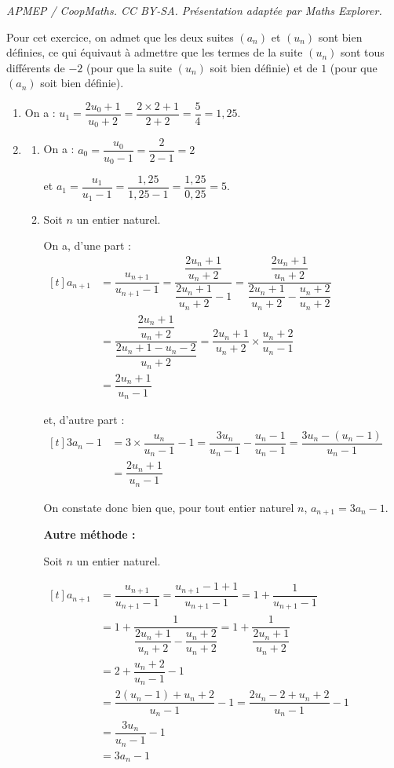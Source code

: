 \documentclass[10pt]{article}
\begin{document}
\noindent\textit{APMEP / CoopMaths. CC BY-SA. Présentation adaptée par Maths Explorer.}\par\medskip
\medskip

Pour cet exercice, on admet que les deux suites $\left(a_n\right)$ et $\left(u_n\right)$ sont bien définies, ce qui équivaut à admettre que les termes de la suite $(u_n)$ sont tous différents de $-2$ (pour que la suite $\left(u_n\right)$ soit bien définie) et de $1$ (pour que $\left(a_n\right)$ soit bien définie).

\begin{enumerate}
\item On a : $u_{1} = \dfrac{2u_0 + 1}{ u_0 + 2} = \dfrac{2\times 2 + 1}{2 + 2 } = \dfrac{5}{4} = 1,25$.
\item 
	\begin{enumerate}
		\item On a : $a_{0} = \dfrac{u_0}{u_0 -1} = \dfrac{2}{2 - 1} = 2$

et $a_{1} = \dfrac{u_1}{u_1 - 1} = \dfrac{1,25}{1,25-1} = \dfrac{1,25}{0,25} = 5$.
		\item Soit $n$ un entier naturel.

On a, d'une part :\quad
	$\begin{aligned}[t]
a_{n+1} &= \dfrac{u_{n+1}}{u_{n+1}-1} = \dfrac{\dfrac{2u_n + 1}{u_n + 2}}{\dfrac{2u_n + 1}{u_n + 2} - 1} = \dfrac{\dfrac{2u_n + 1}{u_n + 2}}{\dfrac{2u_n + 1}{u_n + 2} - \dfrac{u_n + 2}{u_n + 2}}\\
	&=\dfrac{\dfrac{2u_n + 1}{u_n + 2}}{\dfrac{2u_n + 1- u_n - 2}{u_n + 2}} = \dfrac{2u_n + 1}{u_n + 2} \times \dfrac{u_n+2}{u_n -1}\\
	&=\dfrac{2u_n + 1}{u_n-1}
	\end{aligned}$

et, d'autre part :\quad
	$\begin{aligned}[t]
	3a_{n}-1 &= 3\times \dfrac{u_n}{u_n-1} - 1 = \dfrac{3 u_n}{u_n-1} - \dfrac{u_n-1}{u_n-1} = \dfrac{3u_n - (u_n - 1)}{u_n-1}\\
	&=\dfrac{2u_n + 1}{u_n-1}
	\end{aligned}$

On constate donc bien que, pour tout entier naturel $n$, $a_{n+1}=3 a_{n}-1$.

\textbf{Autre méthode :}

Soit $n$ un entier naturel.

$\begin{aligned}[t]
a_{n+1} & = \dfrac{u_{n+1}}{u_{n+1}-1}  =  \dfrac{u_{n+1}-1+1}{u_{n+1}-1}
= 1+ \dfrac{1}{u_{n+1}-1}\\
& = 1 + \dfrac{1}{\dfrac{2u_n + 1}{u_n + 2} - \dfrac{u_n + 2}{u_n + 2}} 
= 1 + \dfrac{1}{\dfrac{2u_n + 1}{u_n + 2}}\\
	& = 2+ \dfrac{u_n+2}{u_n -1} -1 \\
	& = \dfrac{2 ( u_n-1) + u_n+2}{u_n -1} -1 
	= \dfrac{2 u_n-2 + u_n+2}{u_n -1} -1\\
	& = \dfrac{3u_n}{u_n-1} - 1\\
	& = 3a_{n}-1
\end{aligned}$


\end{enumerate}
\end{enumerate}
\end{document}
